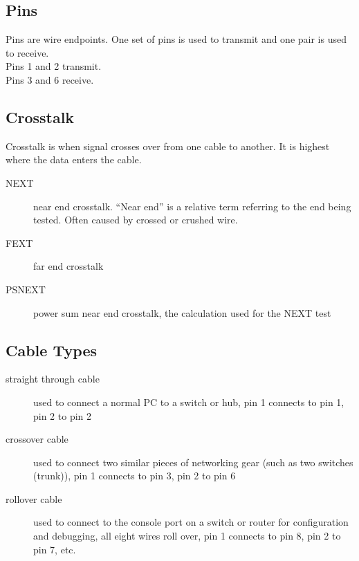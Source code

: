 \subsection{Pins}

Pins are wire endpoints. One set of pins is used to transmit and one pair
is used to receive.\\

Pins 1 and 2 transmit.\\

Pins 3 and 6 receive.

\subsection{Crosstalk}

Crosstalk is when signal crosses over from one cable to another. It is highest
where the data enters the cable.

\begin{description}

\item[NEXT]
near end crosstalk. ``Near end'' is a relative term referring to the end being
tested. Often caused by crossed or crushed wire.

\item[FEXT]
far end crosstalk

\item[PSNEXT]
power sum near end crosstalk, the calculation used for the NEXT test

\end{description}

\subsection{Cable Types}

\begin{description}

\item[straight through cable]
used to connect a normal PC to a switch or hub, pin 1 connects to pin 1, pin 2
to pin 2

\item[crossover cable]
used to connect two similar pieces of networking gear (such as two switches
(trunk)), pin 1 connects to pin 3, pin 2 to pin 6

\item[rollover cable]
used to connect to the console port on a switch or router for configuration and
debugging, all eight wires roll over, pin 1 connects to pin 8, pin 2 to pin 7,
etc.

\end{description}

